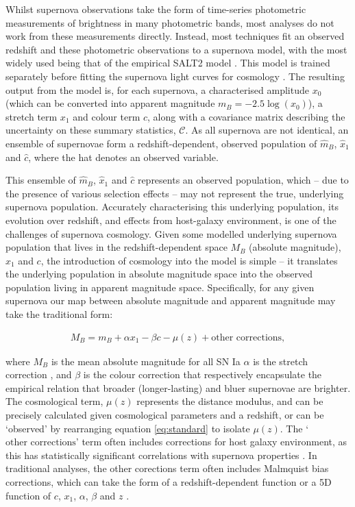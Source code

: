 \documentclass[a4paper,fleqn,usenatbib]{mnras}
\newcommand{\green}{\color{forestgreen}}
\begin{document}
Whilst supernova observations take the form of time-series photometric measurements of brightness in many photometric bands, most analyses do not work from these measurements directly. Instead, most techniques fit an observed redshift and these photometric observations to a supernova model, with the most widely used being that of the empirical SALT2 model \citep{Guy2007, Guy2010}. This model is trained separately before fitting the supernova light curves for cosmology \citep{Guy2010, Betoule2014}. The resulting output from the model is, for each supernova, a characterised amplitude $x_0$ (which can be converted into apparent magnitude $m_B = -2.5\log(x_0)$), a stretch term $x_1$ and colour term $c$, along with a covariance matrix describing the uncertainty on these summary statistics, $\mathcal{C}$. As all supernova are not identical, an ensemble of supernovae form a redshift-dependent, observed population of $\hat{m}_B$, $\hat{x}_1$ and $\hat{c}$, where the hat denotes an observed variable.

This {\green ensemble of $\hat{m}_B$, $\hat{x}_1$ and $\hat{c}$} represents an observed population, which -- due to the presence of various selection effects -- may not represent the true, underlying supernova population. Accurately characterising this underlying population, its evolution over redshift, and effects from {\green host-galaxy} environment, is one of the challenges of supernova cosmology. Given some modelled underlying supernova population that lives in the redshift-dependent space $M_B$ (absolute magnitude), $x_1$ and $c$, the introduction of cosmology into the model is simple -- it translates the underlying population in absolute magnitude space into the observed population living in apparent magnitude space. Specifically, for any given supernova our map between absolute magnitude and apparent magnitude may take the traditional form:

\begin{align}
M_B = m_B + \alpha x_1 - \beta c - \mu(z) + \text{other corrections}, \label{eq:standard}
\end{align}

where $M_B$ is the mean absolute magnitude for all SN Ia  $\alpha$ is the stretch correction \citep{Phillips1993, Phillips1999}, and $\beta$ is the colour correction \citep{Tripp1998} that respectively encapsulate the empirical relation that broader (longer-lasting) and bluer supernovae are brighter. The cosmological term, $\mu(z)$ represents the distance modulus, and can be precisely calculated given cosmological parameters and a redshift, or can be `observed' by rearranging equation \eqref{eq:standard} to isolate $\mu(z)$. The `$\text{other corrections}$' term often includes corrections for host galaxy environment, as this has statistically significant correlations with supernova properties \citep{Kelly2010, Lampeitl2010, Sullivan2010, DAndrea2011, Gupta2011, Johansson2013, Rigault2013, Uddin2017}. In traditional analyses, the other corections term often includes Malmquist bias corrections, which can take the form of a redshift-dependent function \citep{Betoule2014} or a 5D function of $c$, $x_1$, $\alpha$, $\beta$ and $z$ \citep{Scolnic2017}.
\end{document}
